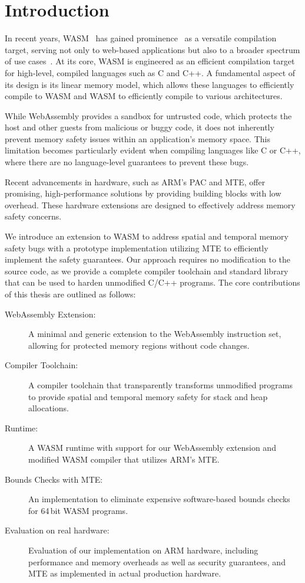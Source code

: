 \chapter{Introduction}
\label{ch:intro}

In recent years, \ac{WASM}~\cite{haas2017bringing} has gained prominence~\cite{musch2019new} as a versatile compilation target, serving not only to web-based applications but also to a broader spectrum of use cases~\cite{wasm_use_cases}.
At its core, \ac{WASM} is engineered as an efficient compilation target for high-level, compiled languages such as C and C++.
A fundamental aspect of its design is its linear memory model, which allows these languages to efficiently compile to \ac{WASM} and \ac{WASM} to efficiently compile to various architectures.

While WebAssembly provides a sandbox for untrusted code, which protects the host and other guests from malicious or buggy code, it does not inherently prevent memory safety issues within an application's memory space.
This limitation becomes particularly evident when compiling languages like C or C++, where there are no language-level guarantees to prevent these bugs.

Recent advancements in hardware, such as ARM's \ac{PAC} and \acf{MTE}, offer promising, high-performance solutions by providing building blocks with low overhead.
These hardware extensions are designed to effectively address memory safety concerns.

We introduce an extension to \ac{WASM} to address spatial and temporal memory safety bugs with a prototype implementation utilizing \ac{MTE} to efficiently implement the safety guarantees.
Our approach requires no modification to the source code, as we provide a complete compiler toolchain and standard library that can be used to harden unmodified C/C++ programs.
The core contributions of this thesis are outlined as follows:

\begin{description}
    \item[WebAssembly Extension:] A minimal and generic extension to the WebAssembly instruction set, allowing for protected memory regions without code changes.
    \item[Compiler Toolchain:] A compiler toolchain that transparently transforms unmodified programs to provide spatial and temporal memory safety for stack and heap allocations.
    \item[Runtime:] A \ac{WASM} runtime with support for our WebAssembly extension and modified \ac{WASM} compiler that utilizes ARM's \ac{MTE}.
    \item[Bounds Checks with \ac{MTE}:] An implementation to eliminate expensive software-based bounds checks for 64\,bit \ac{WASM} programs.
    \item[Evaluation on real hardware:] Evaluation of our implementation on ARM hardware, including performance and memory overheads as well as security guarantees, and \ac{MTE} as implemented in actual production hardware.
\end{description}

